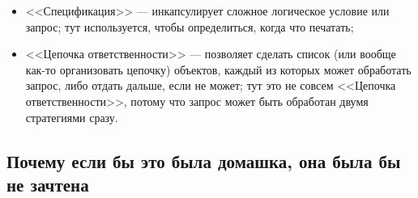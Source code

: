 \documentclass[a5paper]{article}
\begin{document}
\begin{itemize}
\begin{itemize}
        \item <<Спецификация>> --- инкапсулирует сложное логическое условие или запрос; тут используется, чтобы определиться, когда что печатать;
        \item <<Цепочка ответственности>> --- позволяет сделать список (или вообще как-то организовать цепочку) объектов, каждый из которых может обработать запрос, либо отдать дальше, если не может; тут это не совсем <<Цепочка ответственности>>, потому что запрос может быть обработан двумя стратегиями сразу.
    \end{itemize}
\end{itemize}

\subsection{Почему если бы это была домашка, она была бы не зачтена}
\end{document}
